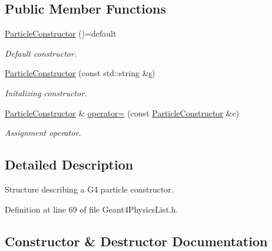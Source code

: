 \subsection*{Public Member Functions}
\begin{DoxyCompactItemize}
\item 
\hyperlink{class_d_d4hep_1_1_simulation_1_1_geant4_physics_list_1_1_particle_constructor_a2b91375ea498cbe3bdd68a7864b676e6}{Particle\+Constructor} ()=default
\begin{DoxyCompactList}\small\item\em Default constructor. \end{DoxyCompactList}\item 
\hyperlink{class_d_d4hep_1_1_simulation_1_1_geant4_physics_list_1_1_particle_constructor_a3c4a6b9ead0cd6c10487c07c3376931d}{Particle\+Constructor} (const std\+::string \&\hyperlink{_volumes_8cpp_a17ca6bfc8040d695d3cada22a4763d40}{s})
\begin{DoxyCompactList}\small\item\em Initalizing constructor. \end{DoxyCompactList}\item 
\hyperlink{class_d_d4hep_1_1_simulation_1_1_geant4_physics_list_1_1_particle_constructor}{Particle\+Constructor} \& \hyperlink{class_d_d4hep_1_1_simulation_1_1_geant4_physics_list_1_1_particle_constructor_a54d456bf5a4f13eeedeaefd879f4f1c8}{operator=} (const \hyperlink{class_d_d4hep_1_1_simulation_1_1_geant4_physics_list_1_1_particle_constructor}{Particle\+Constructor} \&c)
\begin{DoxyCompactList}\small\item\em Assignment operator. \end{DoxyCompactList}\end{DoxyCompactItemize}


\subsection{Detailed Description}
Structure describing a G4 particle constructor. 

Definition at line 69 of file Geant4\+Physics\+List.\+h.



\subsection{Constructor \& Destructor Documentation}
\hypertarget{class_d_d4hep_1_1_simulation_1_1_geant4_physics_list_1_1_particle_constructor_a2b91375ea498cbe3bdd68a7864b676e6}{}\label{class_d_d4hep_1_1_simulation_1_1_geant4_physics_list_1_1_particle_constructor_a2b91375ea498cbe3bdd68a7864b676e6} 
